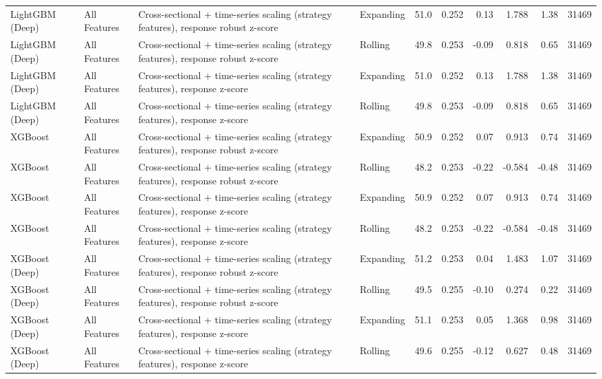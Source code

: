 \begin{tabular}{llllrrrrrr}
LightGBM (Deep) & All Features & Cross-sectional + time-series scaling (strategy features), response robust z-score & Expanding & 51.0 & 0.252 & 0.13 & 1.788 & 1.38 & 31469 \\
LightGBM (Deep) & All Features & Cross-sectional + time-series scaling (strategy features), response robust z-score & Rolling & 49.8 & 0.253 & -0.09 & 0.818 & 0.65 & 31469 \\
LightGBM (Deep) & All Features & Cross-sectional + time-series scaling (strategy features), response z-score & Expanding & 51.0 & 0.252 & 0.13 & 1.788 & 1.38 & 31469 \\
LightGBM (Deep) & All Features & Cross-sectional + time-series scaling (strategy features), response z-score & Rolling & 49.8 & 0.253 & -0.09 & 0.818 & 0.65 & 31469 \\
XGBoost & All Features & Cross-sectional + time-series scaling (strategy features), response robust z-score & Expanding & 50.9 & 0.252 & 0.07 & 0.913 & 0.74 & 31469 \\
XGBoost & All Features & Cross-sectional + time-series scaling (strategy features), response robust z-score & Rolling & 48.2 & 0.253 & -0.22 & -0.584 & -0.48 & 31469 \\
XGBoost & All Features & Cross-sectional + time-series scaling (strategy features), response z-score & Expanding & 50.9 & 0.252 & 0.07 & 0.913 & 0.74 & 31469 \\
XGBoost & All Features & Cross-sectional + time-series scaling (strategy features), response z-score & Rolling & 48.2 & 0.253 & -0.22 & -0.584 & -0.48 & 31469 \\
XGBoost (Deep) & All Features & Cross-sectional + time-series scaling (strategy features), response robust z-score & Expanding & 51.2 & 0.253 & 0.04 & 1.483 & 1.07 & 31469 \\
XGBoost (Deep) & All Features & Cross-sectional + time-series scaling (strategy features), response robust z-score & Rolling & 49.5 & 0.255 & -0.10 & 0.274 & 0.22 & 31469 \\
XGBoost (Deep) & All Features & Cross-sectional + time-series scaling (strategy features), response z-score & Expanding & 51.1 & 0.253 & 0.05 & 1.368 & 0.98 & 31469 \\
XGBoost (Deep) & All Features & Cross-sectional + time-series scaling (strategy features), response z-score & Rolling & 49.6 & 0.255 & -0.12 & 0.627 & 0.48 & 31469 \\
\bottomrule
\end{tabular}
